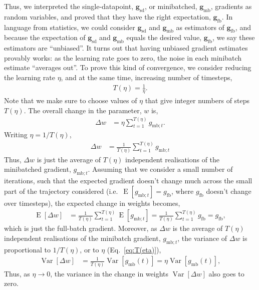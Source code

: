\documentclass{article}
\newcommand{\bracket}[3]{\left#1 #3 \right#2}
\newcommand{\sqb}{\bracket{[}{]}}
\newcommand{\0}{\mathbf{0}}
\newcommand{\g}{\mathbf{g}}
\newcommand{\gfb}{\g_\text{fb}}
\newcommand{\gmb}{\g_\text{mb}}
\newcommand{\gsmbt}{g_{\text{mb}; t}}
\newcommand{\gsfb}{g_\text{fb}}
\newcommand{\gsmb}{g_\text{mb}}
\newcommand{\gsd}{\g_\text{sd}}
\newcommand{\E}{\operatorname{E}\sqb}
\newcommand{\Var}{\operatorname{Var}\sqb}
\begin{document}
Thus, we interpreted the single-datapoint, $\gsd$, or minibatched, $\gmb$, gradients as random variables, and proved that they have the right expectation, $\gfb$.
In language from statistics, we could consider $\gsd$ and $\gmb$ as estimators of $\gfb$, and because the expectation of $\gsd$ and $\gmb$ equals the desired value, $\gfb$, we say these estimators are ``unbiased''.
It turns out that having unbiased gradient estimates provably works: as the learning rate goes to zero, the noise in each minibatch estimate ``averages out''.
To prove this kind of convergence, we consider reducing the learning rate $\eta$, and at the same time, increasing number of timesteps,
\begin{align}
  \label{eq:T(eta)}  
  T(\eta) = \tfrac{1}{\eta}.
\end{align}
Note that we make sure to choose values of $\eta$ that give integer numbers of steps $T(\eta)$.
The overall change in the parameter, $w$ is,
\begin{align}
  \Delta w &= \eta \sum_{t=1}^{T(\eta)} \gsmbt.
\end{align}
Writing $\eta = 1/T(\eta)$,
\begin{align}
  \Delta w &= \frac{1}{T(\eta)} \sum_{t=1}^{T(\eta)} \gsmbt
\end{align}
Thus, $\Delta w$ is just the average of $T(\eta)$ independent realisations of the minibatched gradient, $\gsmbt$.
Assuming that we consider a small number of iterations, such that the expected gradient doesn't change much across the small part of the trajectory considered (i.e.\ $\E{\gsmbt} = \gsfb$, where $\gsfb$ doesn't change over timesteps), the expected change in weights becomes,
\begin{align}
  \E{\Delta w} &= \frac{1}{T(\eta)} \sum_{t=1}^{T(\eta)} \E{\gsmbt} = \frac{1}{T(\eta)} \sum_{t=1}^{T(\eta)} \gsfb = \gsfb,
\end{align}
which is just the full-batch gradient.
Moreover, as $\Delta w$ is the average of $T(\eta)$ independent realisations of the minibatch gradient, $\gsmbt$, the variance of $\Delta w$ is proportional to $1/T(\eta)$, or to $\eta$ (Eq.~\ref{eq:T(eta)}),
\begin{align}
  \Var{\Delta w} &= \tfrac{1}{T(\eta)} \Var{\gsmb(t)} = \eta \Var{\gsmb(t)},
\end{align}
Thus, as $\eta \rightarrow 0$, the variance in the change in weights $\Var{\Delta w}$ also goes to zero.
%
\end{document}
